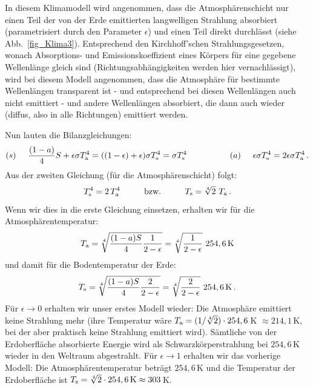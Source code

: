 In diesem Klimamodell wird angenommen, dass die Atmosph\"arenschicht nur einen Teil
der von der Erde emittierten langwelligen Strahlung absorbiert (parametrisiert durch den Parameter $\epsilon$)
und einen Teil direkt durchl\"asst (siehe Abb.\ \ref{fig_Klima3}). Entsprechend den
Kirchhoff'schen Strahlungsgesetzen, wonach Absorptions- und Emissionskoeffizient eines
K\"orpers f\"ur eine gegebene Wellenl\"ange gleich sind (Richtungsabh\"angigkeiten werden hier
vernachl\"assigt), wird bei
diesem Modell angenommen, dass die Atmosph\"are f\"ur bestimmte Wellenl\"angen
transparent ist - und entsprechend bei diesen Wellenl\"angen auch nicht emittiert - 
und andere Wellenl\"angen absorbiert, die dann auch wieder (diffus, also in alle Richtungen) emittiert werden. 

Nun lauten die Bilanzgleichungen:
\begin{equation}
            (s) \hspace{0.5cm}  \frac{(1-a)}{4} S  + \epsilon \sigma T_{\rm a}^4 
                = ((1-\epsilon) + \epsilon) \sigma T_{\rm s}^4 = \sigma T_{\rm s}^4 \hspace{1.8cm}
            (a) \hspace{0.5cm}  \epsilon \sigma T_{\rm s}^4  = 2 \epsilon \sigma T_{\rm a}^4 \, .
\end{equation}
Aus der zweiten Gleichung (f\"ur die Atmosph\"arenschicht) folgt:
\begin{equation}
                 T^4_{\rm s} = 2 \, T^4_{\rm a}  \hspace{1cm} {\rm bzw.} \hspace{1cm}  
                 T_{\rm s} = \sqrt[4]{2} ~ T_{\rm a}  \, .  
\end{equation}
Wenn wir dies in die erste Gleichung einsetzen, erhalten wir f\"ur die Atmosph\"arentemperatur:
\begin{equation}
           T_{\rm a} = \sqrt[4]{\frac{(1-a)S}{4} \frac{1}{2-\epsilon}}
                                =  \sqrt[4]{\frac{1}{2-\epsilon}} ~ 254,6\,{\rm K} 
\end{equation}
und damit f\"ur die Bodentemperatur der Erde:
\begin{equation}
           T_{\rm s} = \sqrt[4]{\frac{(1-a)S}{4} \frac{2}{2-\epsilon}}
                                =  \sqrt[4]{\frac{2}{2-\epsilon}}  ~  254,6\,{\rm K} \, .
\end{equation}
F\"ur $\epsilon \rightarrow 0$ erhalten wir unser erstes Modell wieder: Die Atmosph\"are
emittiert keine Strahlung mehr (ihre Temperatur w\"are $T_{\rm a} = (1/\sqrt[4]{2})\cdot 254,6$\,K
$\approx 214,1$\,K, bei der aber praktisch keine Strahlung emittiert wird). S\"amtliche von der Erdoberfl\"ache
absorbierte Energie wird als Schwarzk\"orperstrahlung bei $254,6$\,K wieder in den Weltraum 
abgestrahlt. F\"ur $\epsilon \rightarrow 1$ erhalten wir das vorherige Modell: Die Atmosph\"arentemperatur
betr\"agt $254,6$\,K und die Temperatur der Erdoberfl\"ache ist $T_{\rm s}=\sqrt[4]{2}\cdot 254,6\,{\rm K}
\approx 303$\,K. 

